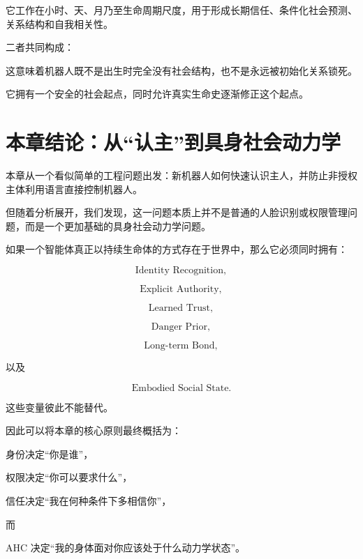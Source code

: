 它工作在小时、天、月乃至生命周期尺度，用于形成长期信任、条件化社会预测、关系结构和自我相关性。

二者共同构成：

\begin{statementbox}
\centering
{}
\end{statementbox}

这意味着机器人既不是出生时完全没有社会结构，也不是永远被初始化关系锁死。

它拥有一个安全的社会起点，同时允许真实生命史逐渐修正这个起点。


\section{本章结论：从“认主”到具身社会动力学}

本章从一个看似简单的工程问题出发：新机器人如何快速认识主人，并防止非授权主体利用语言直接控制机器人。

但随着分析展开，我们发现，这一问题本质上并不是普通的人脸识别或权限管理问题，而是一个更加基础的具身社会动力学问题。

如果一个智能体真正以持续生命体的方式存在于世界中，那么它必须同时拥有：

\[
\text{Identity Recognition},
\]

\[
\text{Explicit Authority},
\]

\[
\text{Learned Trust},
\]

\[
\text{Danger Prior},
\]

\[
\text{Long-term Bond},
\]

以及

\[
\text{Embodied Social State}.
\]

这些变量彼此不能替代。

因此可以将本章的核心原则最终概括为：

\begin{proposition*}
身份决定“你是谁”，
\end{proposition*}

\begin{statementbox}
权限决定“你可以要求什么”，
\end{statementbox}

\begin{statementbox}
信任决定“我在何种条件下多相信你”，
\end{statementbox}

而

\begin{statementbox}
AHC 决定“我的身体面对你应该处于什么动力学状态”。
\end{statementbox}


